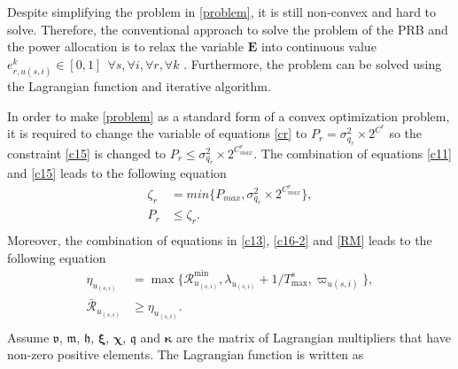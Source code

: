 \documentclass[lettersize,journal]{IEEEtran}
\begin{document}
Despite simplifying the problem in \eqref{problem}, it is still non-convex and hard to solve.
Therefore, the conventional approach to solve the problem of the PRB and the power allocation is to relax the variable $\mathbf{E}$ into continuous value $e_{r,u(s,i)}^k \in [0,1] \:\: \forall s , \forall i ,\forall r, \forall k$ \cite{lee2018dynamic,ali2018joint}.
Furthermore, the problem can be solved using the Lagrangian function and iterative algorithm.

In order to make \eqref{problem} as a standard form of a convex optimization problem, it is required to change the variable of equations \eqref{cr} to $P_r = \sigma_{q_r}^2\times 2^{C^r}$ so the constraint
\eqref{c15} is changed to
 $P_r \leq \sigma_{q_r}^2\times 2^{C^r_{max}}$.
The combination of equations \eqref{c11} and \eqref{c15} leads to the following equation
\begin{equation} \label{pr11}
\begin{split}
\zeta_{r}&= min\{P_{max}, \sigma_{q_r}^2\times 2^{C^r_{max}} \}, \\
P_r &\leq  \zeta_{r}.\\
\end{split}
\end{equation}
Moreover, the combination of equations in \eqref{c13}, \eqref{c16-2} and \eqref{RM} leads to the following equation
\begin{equation}\label{RConstr}
\begin{split}
\eta_{u_{(s,i)}}&= \max\{\mathcal{R}_{u_{(s,i)}}^{\min}, \lambda_{u_{(s,i)}}+1/T^s_{\max}, \varpi_{u(s,i)} \}, \\
\mathcal{\bar{R}}_{u_{(s,i)}} &\geq  \eta_{u_{(s,i)}}.\\
\end{split}
\end{equation}
Assume $\boldsymbol{\mathfrak{v}}$, $\boldsymbol{\mathfrak{m}}$, $\boldsymbol{\mathfrak{h}}$, $\boldsymbol{\xi}$, $\boldsymbol{\chi}$, $\boldsymbol{\mathfrak{q}}$ and $\boldsymbol{ \kappa}$ are the matrix of Lagrangian multipliers that have non-zero positive elements. The Lagrangian function is written as
\end{document}
